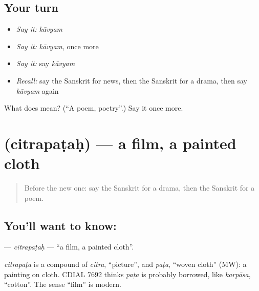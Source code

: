 \subsection*{Your turn}
\begin{itemize}
\raggedright
  \item \emph{Say it:} \emph{kāvyam}
  \item \emph{Say it:} \emph{kāvyam}, once more
  \item \emph{Say it:} say \emph{kāvyam}
  \item \emph{Recall:} say the Sanskrit for news, then the Sanskrit for a drama, then say \emph{kāvyam} again
\end{itemize}

\begin{tcolorbox}[breakable,colback=teal!4,colframe=teal!35!black,title={Before you move on}]
What does  mean? (\textquotedblleft{}A poem, poetry\textquotedblright{}.) Say it once more.
\end{tcolorbox}
\section[\texorpdfstring{\sk{चित्रपटः} (citrapaṭaḥ)}{चित्रपटः (citrapaṭaḥ)}]{ (citrapaṭaḥ) — a film, a painted cloth}

\label{lesson:SA-C249-citrapatah}



\begin{quote}
Before the new one: say the Sanskrit for a drama, then the Sanskrit for a poem.
\end{quote}

\subsection*{You'll want to know: }
\textbf{} — \emph{citrapaṭaḥ} — \textquotedblleft{}a film, a painted cloth\textquotedblright{}.

\begin{cousinweb}
\emph{citrapaṭa} is a compound of \emph{citra}, \textquotedblleft{}picture\textquotedblright{}, and \emph{paṭa}, \textquotedblleft{}woven cloth\textquotedblright{} (MW): a painting on cloth. CDIAL 7692 thinks \emph{paṭa} is probably borrowed, like \emph{karpāsa}, \textquotedblleft{}cotton\textquotedblright{}. The sense \textquotedblleft{}film\textquotedblright{} is modern.
\end{cousinweb}

